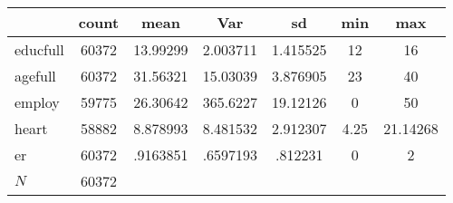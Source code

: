{
\def\sym#1{\ifmmode^{#1}\else\(^{#1}\)\fi}
\begin{tabular}{l*{1}{cccccc}}
\hline\hline
            &       count&        mean&         Var&          sd&         min&         max\\
\hline
educfull    &       60372&    13.99299&    2.003711&    1.415525&          12&          16\\
agefull     &       60372&    31.56321&    15.03039&    3.876905&          23&          40\\
employ      &       59775&    26.30642&    365.6227&    19.12126&           0&          50\\
heart       &       58882&    8.878993&    8.481532&    2.912307&        4.25&    21.14268\\
er          &       60372&    .9163851&    .6597193&     .812231&           0&           2\\
\hline
\(N\)       &       60372&            &            &            &            &            \\
\hline\hline
\end{tabular}
}
